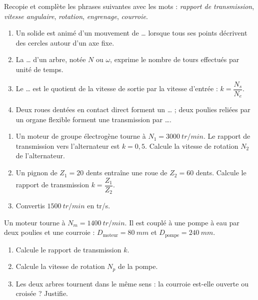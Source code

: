 \documentclass[11pt]{article}
\newcounter{popsec}
\newcounter{popsub}
\newcommand{\courssub}[1]{%
  \stepcounter{popsub}%
  \par\vspace{9pt}\noindent{\popxbold\fontsize{11.5}{13}\selectfont\color{popink}{\color{poporange}\thepopsec.\thepopsub}\hspace{6pt}#1}\par\nopagebreak\vspace{4pt}
}
\begin{document}
\begin{exercice}
Recopie et complète les phrases suivantes avec les mots : \emph{rapport de transmission}, \emph{vitesse angulaire}, \emph{rotation}, \emph{engrenage}, \emph{courroie}.
\begin{enumerate}
\item Un solide est animé d'un mouvement de \ldots{} lorsque tous ses points décrivent des cercles autour d'un axe fixe.
\item La \ldots{} d'un arbre, notée $N$ ou $\omega$, exprime le nombre de tours effectués par unité de temps.
\item Le \ldots{} est le quotient de la vitesse de sortie par la vitesse d'entrée : $k = \dfrac{N_s}{N_e}$.
\item Deux roues dentées en contact direct forment un \ldots{} ; deux poulies reliées par un organe flexible forment une transmission par \ldots{}.
\end{enumerate}
\end{exercice}

\begin{exercice}
\begin{enumerate}
\item Un moteur de groupe électrogène tourne à $N_1 = \SI{3000}{tr/min}$. Le rapport de transmission vers l'alternateur est $k = 0,5$. Calcule la vitesse de rotation $N_2$ de l'alternateur.
\item Un pignon de $Z_1 = 20$ dents entraîne une roue de $Z_2 = 60$ dents. Calcule le rapport de transmission $k = \dfrac{Z_1}{Z_2}$.
\item Convertis $\SI{1500}{tr/min}$ en tr/s.
\end{enumerate}
\end{exercice}

\courssub{Je m'entraîne}

\begin{exercice}
Un moteur tourne à $N_m = \SI{1400}{tr/min}$. Il est couplé à une pompe à eau par deux poulies et une courroie : $D_{\text{moteur}} = \SI{80}{mm}$ et $D_{\text{pompe}} = \SI{240}{mm}$.
\begin{enumerate}
\item Calcule le rapport de transmission $k$.
\item Calcule la vitesse de rotation $N_p$ de la pompe.
\item Les deux arbres tournent dans le même sens : la courroie est-elle ouverte ou croisée ? Justifie.
\end{enumerate}
\end{exercice}
\end{document}

